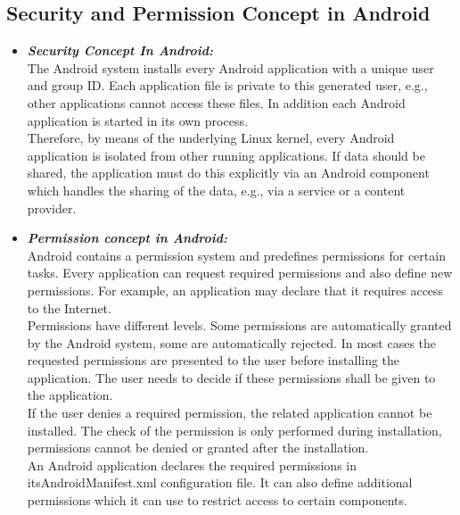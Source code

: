 \subsection{Security and Permission Concept in Android}

\begin{itemize}
\item \textbf{\emph{Security Concept In Android:}}\\
The Android system installs every Android application with a unique user
and group ID. Each application file is private to this generated user, e.g.,
other applications cannot access these files. In addition each Android
application is started in its own process.\\

Therefore, by means of the underlying Linux kernel, every Android
application is isolated from other running applications.
If data should be shared, the application must do this explicitly via an
Android component which handles the sharing of the data, e.g., via a
service or a content provider.

\item \textbf{\emph{Permission concept in Android:}}\\
Android contains a permission system and predefines permissions for
certain tasks. Every application can request required permissions and also
define new permissions. For example, an application may declare that it
requires access to the Internet.\\

Permissions have different levels. Some permissions are automatically
granted by the Android system, some are automatically rejected. In most
cases the requested permissions are presented to the user before installing
the application. The user needs to decide if these permissions shall be
given to the application.\\

If the user denies a required permission, the related application cannot be
installed. The check of the permission is only performed during
installation, permissions cannot be denied or granted after the installation.\\

An Android application declares the required permissions in itsAndroidManifest.xml configuration file. It can also define additional
permissions which it can use to restrict access to certain components.
\end{itemize}



